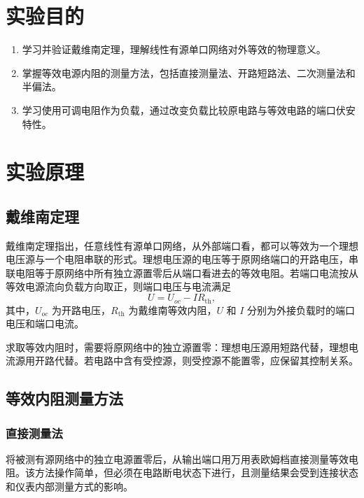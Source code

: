 \section{实验目的}

\begin{enumerate}[label=\arabic*.]
    \item 学习并验证戴维南定理，理解线性有源单口网络对外等效的物理意义。
    \item 掌握等效电源内阻的测量方法，包括直接测量法、开路短路法、二次测量法和半偏法。
    \item 学习使用可调电阻作为负载，通过改变负载比较原电路与等效电路的端口伏安特性。
\end{enumerate}

\section{实验原理}

\subsection{戴维南定理}

戴维南定理指出，任意线性有源单口网络，从外部端口看，都可以等效为一个理想电压源与一个电阻串联的形式。理想电压源的电压等于原网络端口的开路电压，串联电阻等于原网络中所有独立源置零后从端口看进去的等效电阻。若端口电流按从等效电源流向负载方向取正，则端口电压与电流满足
\begin{equation}
    U = U_{oc} - I R_{\mathrm{th}},
\end{equation}
其中，\(U_{oc}\) 为开路电压，\(R_{\mathrm{th}}\) 为戴维南等效内阻，\(U\) 和 \(I\) 分别为外接负载时的端口电压和端口电流。

求取等效内阻时，需要将原网络中的独立源置零：理想电压源用短路代替，理想电流源用开路代替。若电路中含有受控源，则受控源不能置零，应保留其控制关系。

\subsection{等效内阻测量方法}

\subsubsection{直接测量法}

将被测有源网络中的独立电源置零后，从输出端口用万用表欧姆档直接测量等效电阻。该方法操作简单，但必须在电路断电状态下进行，且测量结果会受到连接状态和仪表内部测量方式的影响。

